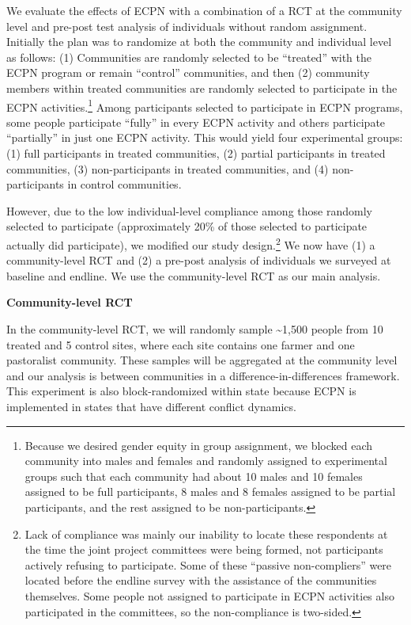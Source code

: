 \documentclass[
]{article}
\begin{document}
We evaluate the effects of ECPN with a combination of a RCT at the
community level and pre-post test analysis of individuals without random
assignment. Initially the plan was to randomize at both the community
and individual level as follows: (1) Communities are randomly selected
to be ``treated'' with the ECPN program or remain ``control''
communities, and then (2) community members within treated communities
are randomly selected to participate in the ECPN activities.\footnote{Because
  we desired gender equity in group assignment, we blocked each
  community into males and females and randomly assigned to experimental
  groups such that each community had about 10 males and 10 females
  assigned to be full participants, 8 males and 8 females assigned to be
  partial participants, and the rest assigned to be non-participants.}
Among participants selected to participate in ECPN programs, some people
participate ``fully'' in every ECPN activity and others participate
``partially'' in just one ECPN activity. This would yield four
experimental groups: (1) full participants in treated communities, (2)
partial participants in treated communities, (3) non-participants in
treated communities, and (4) non-participants in control communities.

However, due to the low individual-level compliance among those randomly
selected to participate (approximately 20\% of those selected to
participate actually did participate), we modified our study
design.\footnote{Lack of compliance was mainly our inability to locate
  these respondents at the time the joint project committees were being
  formed, not participants actively refusing to participate. Some of
  these ``passive non-compliers'' were located before the endline survey
  with the assistance of the communities themselves. Some people not
  assigned to participate in ECPN activities also participated in the
  committees, so the non-compliance is two-sided.} We now have (1) a
community-level RCT and (2) a pre-post analysis of individuals we
surveyed at baseline and endline. We use the community-level RCT as our
main analysis.

\textbf{Community-level RCT}

In the community-level RCT, we will randomly sample \textasciitilde1,500
people from 10 treated and 5 control sites, where each site contains one
farmer and one pastoralist community. These samples will be aggregated
at the community level and our analysis is between communities in a
difference-in-differences framework. This experiment is also
block-randomized within state because ECPN is implemented in states that
have different conflict dynamics.
\end{document}
